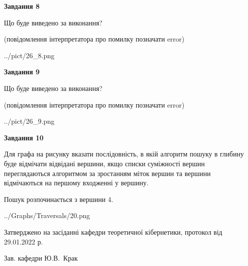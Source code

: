 \documentclass[12pt, ukrainian]{article}
\begin{document}
{\begin {large}
{\begin {center}\textbf{Завдання 8}\end {center}}\par
Що буде виведено за виконання?\par
 (повідомлення інтерпретатора про помилку позначати error)\par
\begin{center}
	{../pict/26_8.png}
\end{center}
\newpage

{\begin {center}\textbf{Завдання 9}\end {center}}\par
Що буде виведено за виконання?\par
 (повідомлення інтерпретатора про помилку позначати error)\par
\begin{center}
	{../pict/26_9.png}
\end{center}
\newpage

{\begin {center}\textbf{Завдання 10}\end {center}}\par
Для графа на рисунку вказати послідовність, в якій алгоритм пошуку в глибину буде відмічати відвідані вершини, якщо списки суміжності вершин переглядаються алгоритмом за зростанням міток вершин та вершини відмічаються на першому вход\-женні у вершину.\par
Пошук розпочинається з вершини 4.\par

\begin{center}
	{../Graphs/Traversals/20.png}
\end{center}\par
\newpage


\end {large}
}
{\smallskip \begin {small} Затверджено на засіданні кафедри теоретичної кібернетики, протокол  від   29.01.2022 р.\par\smallskip\smallskip
{\parbox {6.5 cm}{Зав. кафедри \dotfill Ю.В.~Крак}} \end{small}}
\end{document}
